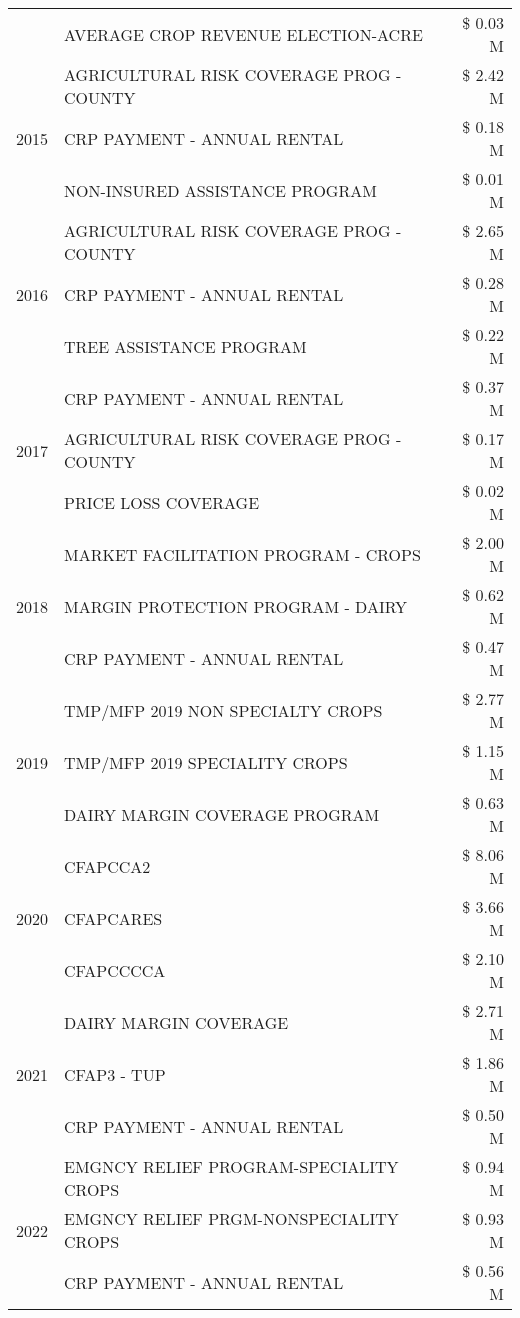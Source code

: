 \begin{tabular}{llr}
 & AVERAGE CROP REVENUE ELECTION-ACRE & \$ 0.03 M \\
\cline{1-3}
\multirow[t]{3}{*}{2015} & AGRICULTURAL RISK COVERAGE PROG - COUNTY & \$ 2.42 M \\
 & CRP PAYMENT - ANNUAL RENTAL & \$ 0.18 M \\
 & NON-INSURED ASSISTANCE PROGRAM & \$ 0.01 M \\
\cline{1-3}
\multirow[t]{3}{*}{2016} & AGRICULTURAL RISK COVERAGE PROG - COUNTY & \$ 2.65 M \\
 & CRP PAYMENT - ANNUAL RENTAL & \$ 0.28 M \\
 & TREE ASSISTANCE PROGRAM & \$ 0.22 M \\
\cline{1-3}
\multirow[t]{3}{*}{2017} & CRP PAYMENT - ANNUAL RENTAL & \$ 0.37 M \\
 & AGRICULTURAL RISK COVERAGE PROG - COUNTY & \$ 0.17 M \\
 & PRICE LOSS COVERAGE & \$ 0.02 M \\
\cline{1-3}
\multirow[t]{3}{*}{2018} & MARKET FACILITATION PROGRAM - CROPS & \$ 2.00 M \\
 & MARGIN PROTECTION PROGRAM - DAIRY & \$ 0.62 M \\
 & CRP PAYMENT - ANNUAL RENTAL & \$ 0.47 M \\
\cline{1-3}
\multirow[t]{3}{*}{2019} & TMP/MFP 2019 NON SPECIALTY CROPS & \$ 2.77 M \\
 & TMP/MFP 2019 SPECIALITY CROPS & \$ 1.15 M \\
 & DAIRY MARGIN COVERAGE PROGRAM & \$ 0.63 M \\
\cline{1-3}
\multirow[t]{3}{*}{2020} & CFAPCCA2 & \$ 8.06 M \\
 & CFAPCARES & \$ 3.66 M \\
 & CFAPCCCCA & \$ 2.10 M \\
\cline{1-3}
\multirow[t]{3}{*}{2021} & DAIRY MARGIN COVERAGE & \$ 2.71 M \\
 & CFAP3 - TUP & \$ 1.86 M \\
 & CRP PAYMENT - ANNUAL RENTAL & \$ 0.50 M \\
\cline{1-3}
\multirow[t]{3}{*}{2022} & EMGNCY RELIEF PROGRAM-SPECIALITY CROPS & \$ 0.94 M \\
 & EMGNCY RELIEF PRGM-NONSPECIALITY CROPS & \$ 0.93 M \\
 & CRP PAYMENT - ANNUAL RENTAL & \$ 0.56 M \\
\cline{1-3}
\bottomrule
\end{tabular}
